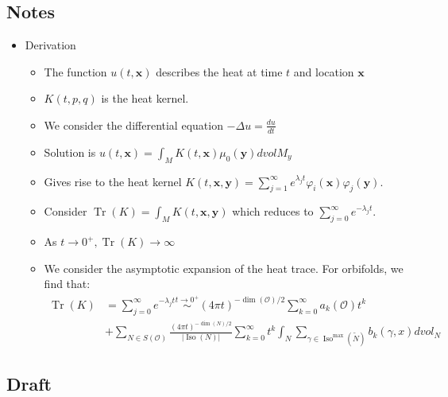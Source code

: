 \documentclass{article}
\newcommand{\myabs}[1]{\vert#1\vert}
\DeclareMathOperator{\iso}{Iso}
\DeclareMathOperator{\tr}{Tr}
\begin{document}
\subsection{Notes}
\begin{itemize}
   \item Derivation
       \begin{itemize}
        \item The function $u(t,\mathbf{x})$ describes the heat at time $t$ and location $\mathbf{x}$
        \item $K(t,p,q)$ is the heat kernel. 
        \item We consider the differential equation $-\Delta u= \frac{du}{dt}$
        \item Solution is $u(t,\mathbf{x}) = \int_M K(t,\mathbf{x}) \mu_0(\mathbf{y}) dvolM_y $
        \item Gives rise to the heat kernel $K(t,\mathbf{x},\mathbf{y}) = \sum_{j=1}^{\infty} e^{\lambda_j t} \varphi_i(\mathbf{x}) \varphi_j(\mathbf{y})$.
        \item Consider $\tr(K) = \int_M K(t,\mathbf{x},\mathbf{y})$ which reduces to $\sum_{j=0}^{\infty}e^{-\lambda_j t}$.
        \item As $t \rightarrow 0^{+}, \tr(K) \rightarrow \infty$
        \item We consider the asymptotic expansion of the heat trace. For orbifolds, we find that:
       \begin{align*}
            \tr(K) &= \sum_{j=0}^{\infty}e^{-\lambda_j t}
            \stackrel{t\rightarrow 0^+}{\sim} {(4\pi t)}^{-\dim(\mathcal{O})/2}\sum_{k=0}^{\infty}a_k(\mathcal{O})t^k \\
            &+\sum_{N \in S(\mathcal{O})}\frac{{(4\pi t)}^{-\dim(N)/2}}{\myabs{\iso(N)}}\sum_{k=0}^{\infty}t^k\int_{N} \sum_{\gamma \in \iso^{\max}(\tilde{N})}b_k(\gamma,x) dvol_N
       \end{align*}
   \end{itemize}
\end{itemize}

\subsection{Draft}
    
\end{document}
